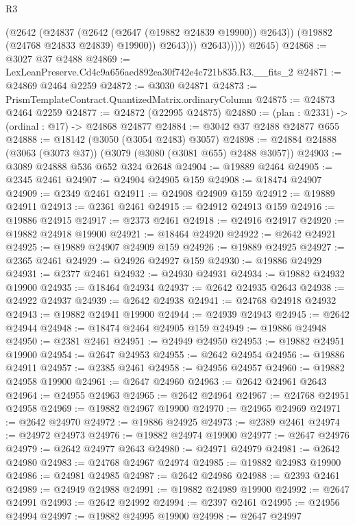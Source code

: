 \begin{lexlean}{R3}
\begin{coremodule}
                      (@2642
                        (@24837 (@2642 (@2647 (@19882 @24839 @19900)) @2643))
                        (@19882 (@24768 @24833 @24839) @19900))
                      @2643)))
                @2643)))))
      @2645)
@24868 := @3027 @37 @2488
@24869 := LexLeanPreserve.Cd4c9a656aed892ea30f742e4c721b835.R3.__fits_2
@24871 := @24869 @2464 @2259
@24872 := @3030 @24871
@24873 := PrismTemplateContract.QuantizedMatrix.ordinaryColumn
@24875 := @24873 @2464 @2259
@24877 := @24872 (@22995 @24875)
@24880 := (plan : @2331) -> (ordinal : @17) -> @24868 @24877
@24884 := @3042 @37 @2488 @24877 @655
@24888 := @18142 (@3050 (@3054 @2483) @3057)
@24898 := @24884 @24888 (@3063 (@3073 @37)) (@3079 (@3080 (@3081 @655) @2488 @3057))
@24903 := @3089 @24888 @536 @652 @324 @2648
@24904 := @19889 @2464
@24905 := @2345 @2461
@24907 := @24904 @24905 @159
@24908 := @18474 @24907
@24909 := @2349 @2461
@24911 := @24908 @24909 @159
@24912 := @19889 @24911
@24913 := @2361 @2461
@24915 := @24912 @24913 @159
@24916 := @19886 @24915
@24917 := @2373 @2461
@24918 := @24916 @24917
@24920 := @19882 @24918 @19900
@24921 := @18464 @24920
@24922 := @2642 @24921
@24925 := @19889 @24907 @24909 @159
@24926 := @19889 @24925
@24927 := @2365 @2461
@24929 := @24926 @24927 @159
@24930 := @19886 @24929
@24931 := @2377 @2461
@24932 := @24930 @24931
@24934 := @19882 @24932 @19900
@24935 := @18464 @24934
@24937 := @2642 @24935 @2643
@24938 := @24922 @24937
@24939 := @2642 @24938
@24941 := @24768 @24918 @24932
@24943 := @19882 @24941 @19900
@24944 := @24939 @24943
@24945 := @2642 @24944
@24948 := @18474 @2464 @24905 @159
@24949 := @19886 @24948
@24950 := @2381 @2461
@24951 := @24949 @24950
@24953 := @19882 @24951 @19900
@24954 := @2647 @24953
@24955 := @2642 @24954
@24956 := @19886 @24911
@24957 := @2385 @2461
@24958 := @24956 @24957
@24960 := @19882 @24958 @19900
@24961 := @2647 @24960
@24963 := @2642 @24961 @2643
@24964 := @24955 @24963
@24965 := @2642 @24964
@24967 := @24768 @24951 @24958
@24969 := @19882 @24967 @19900
@24970 := @24965 @24969
@24971 := @2642 @24970
@24972 := @19886 @24925
@24973 := @2389 @2461
@24974 := @24972 @24973
@24976 := @19882 @24974 @19900
@24977 := @2647 @24976
@24979 := @2642 @24977 @2643
@24980 := @24971 @24979
@24981 := @2642 @24980
@24983 := @24768 @24967 @24974
@24985 := @19882 @24983 @19900
@24986 := @24981 @24985
@24987 := @2642 @24986
@24988 := @2393 @2461
@24989 := @24949 @24988
@24991 := @19882 @24989 @19900
@24992 := @2647 @24991
@24993 := @2642 @24992
@24994 := @2397 @2461
@24995 := @24956 @24994
@24997 := @19882 @24995 @19900
@24998 := @2647 @24997

\end{coremodule}
\end{lexlean}
